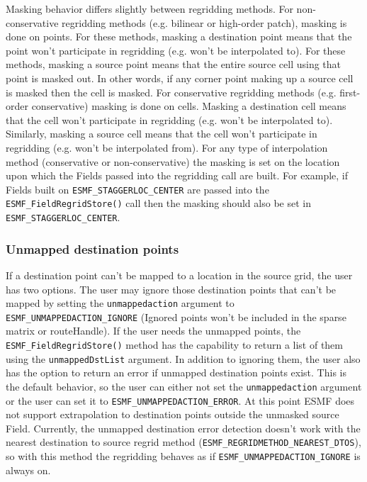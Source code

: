  Masking behavior differs slightly between regridding methods. For non-conservative regridding methods (e.g. bilinear or high-order patch), masking is done on
 points. For these methods, masking a destination point means that the point won't participate in regridding (e.g. won't be interpolated to). For these methods, 
 masking a source point means that the entire source cell using that point is masked out. In other words, if any corner point making up a source cell is masked 
 then the cell is masked. For conservative regridding methods (e.g. first-order conservative) masking is done on cells. Masking a destination cell means that the 
 cell won't participate in regridding (e.g. won't be interpolated to). Similarly, masking a source cell means that the cell won't participate in regridding 
 (e.g. won't be interpolated from). For any type of interpolation method (conservative or non-conservative) the masking is set on the location upon which the 
 Fields passed into the regridding call are built. For example, if Fields built on {\tt ESMF\_STAGGERLOC\_CENTER} are passed into the {\tt ESMF\_FieldRegridStore()} 
 call then the masking should also be set in {\tt ESMF\_STAGGERLOC\_CENTER}.


\subsubsection{Unmapped destination points}
 If a destination point can't be mapped to a location in the source grid, the user has two options. The user may ignore those destination points
 that can't be mapped by setting the {\tt unmappedaction} argument to {\tt ESMF\_UNMAPPEDACTION\_IGNORE} (Ignored points won't be included in
 the sparse matrix or routeHandle). If the user needs the unmapped points, the {\tt ESMF\_FieldRegridStore()} method has the capability to return
 a list of them using the {\tt unmappedDstList} argument.  In addition to ignoring them, the user also has the option to return
 an error if unmapped destination points exist. This is the default behavior, so the user can either not set the {\tt unmappedaction} argument
 or the user can set it to {\tt ESMF\_UNMAPPEDACTION\_ERROR}. At this point ESMF does not support extrapolation to destination points outside 
 the unmasked source Field. Currently, the unmapped destination error detection doesn't work with the nearest destination to source regrid method
({\tt ESMF\_REGRIDMETHOD\_NEAREST\_DTOS}), so with this method the regridding behaves as if {\tt ESMF\_UNMAPPEDACTION\_IGNORE} is always on. 


